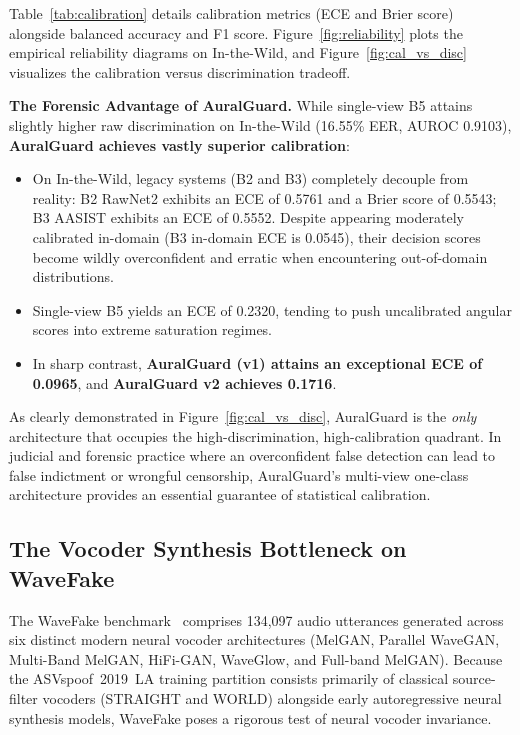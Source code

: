 Table~\ref{tab:calibration} details calibration metrics (ECE and Brier score) alongside balanced accuracy and F1 score. Figure~\ref{fig:reliability} plots the empirical reliability diagrams on In-the-Wild, and Figure~\ref{fig:cal_vs_disc} visualizes the calibration versus discrimination tradeoff.

\textbf{The Forensic Advantage of AuralGuard.} While single-view B5 attains slightly higher raw discrimination on In-the-Wild (16.55\% EER, AUROC 0.9103), \textbf{AuralGuard achieves vastly superior calibration}:
\begin{itemize}
    \item On In-the-Wild, legacy systems (B2 and B3) completely decouple from reality: B2 RawNet2 exhibits an ECE of 0.5761 and a Brier score of 0.5543; B3 AASIST exhibits an ECE of 0.5552. Despite appearing moderately calibrated in-domain (B3 in-domain ECE is 0.0545), their decision scores become wildly overconfident and erratic when encountering out-of-domain distributions.
    \item Single-view B5 yields an ECE of 0.2320, tending to push uncalibrated angular scores into extreme saturation regimes.
    \item In sharp contrast, \textbf{AuralGuard (v1) attains an exceptional ECE of 0.0965}, and \textbf{AuralGuard v2 achieves 0.1716}.
\end{itemize}
As clearly demonstrated in Figure~\ref{fig:cal_vs_disc}, AuralGuard is the \emph{only} architecture that occupies the high-discrimination, high-calibration quadrant. In judicial and forensic practice where an overconfident false detection can lead to false indictment or wrongful censorship, AuralGuard's multi-view one-class architecture provides an essential guarantee of statistical calibration.

\subsection{The Vocoder Synthesis Bottleneck on WaveFake}
\label{ssec:wavefake}

The WaveFake benchmark~\cite{frank2021wavefake} comprises 134,097 audio utterances generated across six distinct modern neural vocoder architectures (MelGAN, Parallel WaveGAN, Multi-Band MelGAN, HiFi-GAN, WaveGlow, and Full-band MelGAN). Because the ASVspoof~2019~LA training partition consists primarily of classical source-filter vocoders (STRAIGHT and WORLD) alongside early autoregressive neural synthesis models, WaveFake poses a rigorous test of neural vocoder invariance.

